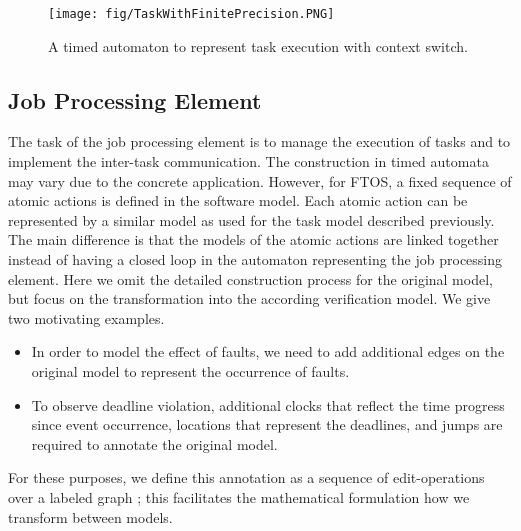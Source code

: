 \documentclass[10pt, a4paper, onecolumn, conference, compsocconf]{IEEEtran}
\begin{document}
\begin{figure}
 \centering
 \texttt{[image: fig/TaskWithFinitePrecision.PNG]}
 \caption{A timed automaton to represent task execution with context switch.}
 \label{fig:TA.task}
\end{figure}

\subsection{Job Processing Element\label{sec.Job.Processing.Element}}
The task of the job processing element is to manage the execution of tasks and to implement the inter-task communication. The construction in timed automata may vary due to the concrete application. However, for FTOS, a fixed sequence of atomic actions is defined in the software model. Each atomic action can be represented by a similar model as used for the task model described previously. The main difference is that the models of the atomic actions are linked together instead of having a closed loop in the automaton representing the job processing element. Here we omit the detailed construction process for the original model, but focus on the transformation into the according verification model. We give two motivating examples.

\begin{itemize}
    \item In order to model the effect of faults, we need to add additional edges on the original model to represent the occurrence of faults.
    \item To observe deadline violation, additional clocks that reflect the time progress since event occurrence, locations that represent the deadlines, and jumps are required to annotate the original model.
\end{itemize}

For these purposes, we define this annotation as a sequence of edit-operations over a labeled graph \cite{wang2008prs}; this facilitates the mathematical formulation how we transform between models.
\end{document}
